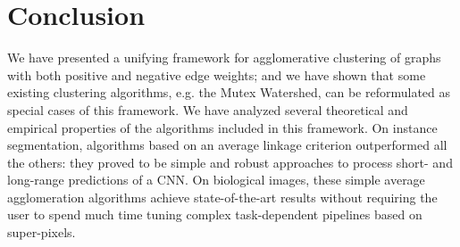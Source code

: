 \section{Conclusion}
We have presented a unifying framework for agglomerative clustering of graphs with both positive and negative edge weights; and we have shown that some existing clustering algorithms, e.g. the Mutex Watershed, can be reformulated as special cases of this framework. 
We have analyzed several theoretical and empirical properties of the algorithms included in this framework. On instance segmentation, algorithms based on an average linkage criterion outperformed all the others: they proved to be simple and robust approaches to process short- and long-range predictions of a CNN.
On biological images, these simple average agglomeration algorithms achieve state-of-the-art results without requiring the user to spend much time tuning complex task-dependent pipelines based on super-pixels.
